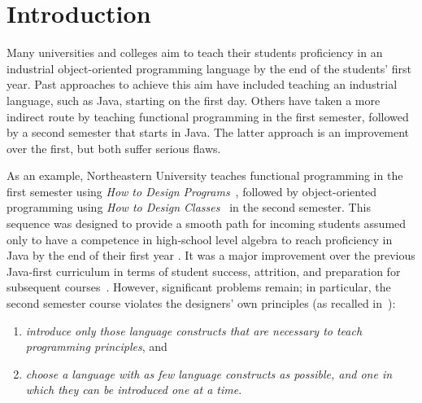 \documentclass[submission,copyright]{eptcs}
\title{\thetitle}
\author{Sam Tobin-Hochstadt \quad\qquad David Van Horn
\institute{Northeastern University\\
Boston, Massachusetts, USA}
\email{\{samth,dvanhorn\}@ccs.neu.edu}
}
\begin{document}
\maketitle

\begin{abstract}
We propose a bridge between functional and object-oriented programming
in the first-year curriculum.
\end{abstract}

\section{Introduction}
\label{sec:intro}

Many universities and colleges aim to teach their students proficiency
in an industrial object-oriented programming language by the end of
the students' first year.  Past approaches to achieve this aim have
included teaching an industrial language, such as Java, starting on
the first day.  Others have taken a more indirect route by teaching
functional programming in the first semester, followed by a second
semester that starts in Java.  The latter approach is an improvement
over the first, but both suffer serious flaws.

As an example, Northeastern University teaches functional programming
in the first semester using \emph{How to Design
  Programs}~\cite{dvanhorn:Felleisen2001How}, followed by
object-oriented programming using \emph{How to Design
  Classes}~\cite{local:htdc} in the second semester.  This sequence
was designed to provide a smooth path for incoming students assumed
only to have a competence in high-school level algebra to reach
proficiency in Java by the end of their first year
\cite{dvanhorn:Felleisen2004Structure}.  It was a major improvement
over the previous Java-first curriculum in terms of student success,
attrition, and preparation for subsequent
courses~\cite{dvanhorn:Proulx2006Design}.  However, significant
problems remain; in particular, the second semester course violates
the designers' own principles (as recalled
in~\cite{dvanhorn:Bloch2000Scheme}):
%
\begin{enumerate}
\item \emph{introduce only those language constructs that are necessary to
  teach programming principles}, and
\item \emph{choose a language with as
  few language constructs as possible, and one in which they can be
  introduced one at a time}.
\end{enumerate}
\end{document}

